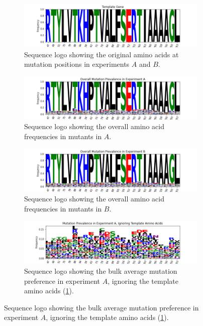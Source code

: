 \documentclass[16pt]{book}
\begin{document}
\begin{figure}
	\caption{\label{logos} Sequence logos.}
\begin{subfigure}{\textwidth}
	\includegraphics[width=\textwidth]{img/template-logo.png}
	\caption{\label{logot} Sequence logo showing the original amino acids at mutation positions in experiments $A$ and $B$.}
\end{subfigure}
\begin{subfigure}{\textwidth}
	\includegraphics[width=\textwidth]{img/exp-a-logo.png}
	\caption{\label{logoa} Sequence logo showing the overall amino acid frequencies in mutants in $A$.}
\end{subfigure}
\begin{subfigure}{\textwidth}
	\includegraphics[width=\textwidth]{img/exp-b-logo.png}
	\caption{\label{logob} Sequence logo showing the overall amino acid frequencies in mutants in $B$.}
\end{subfigure}
\begin{subfigure}{\textwidth}
	\includegraphics[width=\textwidth]{img/expa-logo-notemplate.png}
	\caption{\label{logonotpa} Sequence logo showing the bulk average mutation preference in experiment $A$, ignoring the template amino acids (\ref{logot}).}

\end{subfigure}
\end{figure}
\end{document}
